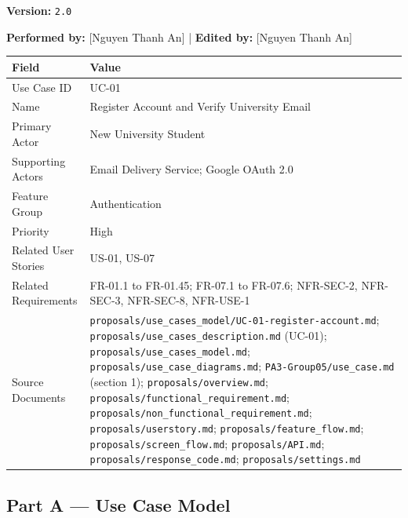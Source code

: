 \documentclass[12pt]{article}
\renewcommand{\baselinestretch}{1.5}
\begin{document}
\textbf{Version:} \texttt{2.0}
\par\medskip

\textbf{Performed by:} [Nguyen Thanh An] | \textbf{Edited by:} [Nguyen Thanh An]
\par\medskip

\begingroup
\small
\renewcommand{\baselinestretch}{1.0}\selectfont
\renewcommand{\arraystretch}{1.15}
\setlength{\tabcolsep}{6pt}
\begin{longtable}{|>{\raggedright\arraybackslash}p{}|>{\raggedright\arraybackslash}p{}|}
\hline
\textbf{Field} & \textbf{Value} \\ \hline
\endhead
Use Case ID & UC-01 \\ \hline
Name & Register Account and Verify University Email \\ \hline
Primary Actor & New University Student \\ \hline
Supporting Actors & Email Delivery Service; Google OAuth 2.0 \\ \hline
Feature Group & Authentication \\ \hline
Priority & High \\ \hline
Related User Stories & US-01, US-07 \\ \hline
Related Requirements & FR-01.1 to FR-01.45; FR-07.1 to FR-07.6; NFR-SEC-2, NFR-SEC-3, NFR-SEC-8, NFR-USE-1 \\ \hline
Source Documents & \texttt{proposals/use\_cases\_model/UC-01-register-account.md}; \texttt{proposals/use\_cases\_description.md} (UC-01); \texttt{proposals/use\_cases\_model.md}; \texttt{proposals/use\_case\_diagrams.md}; \texttt{PA3-Group05/use\_case.md} (section 1); \texttt{proposals/overview.md}; \texttt{proposals/functional\_requirement.md}; \texttt{proposals/non\_functional\_requirement.md}; \texttt{proposals/userstory.md}; \texttt{proposals/feature\_flow.md}; \texttt{proposals/screen\_flow.md}; \texttt{proposals/API.md}; \texttt{proposals/response\_code.md}; \texttt{proposals/settings.md} \\ \hline
\end{longtable}
\endgroup
\par\medskip

\hypertarget{sec:part-a-use-case-model}{}
\subsection*{Part A --- Use Case Model}
\par\medskip
\end{document}
